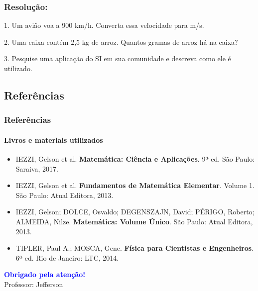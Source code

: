 \documentclass[12pt]{beamer}
\begin{document}
\begin{frame}
\frametitle{Resolução:}
1. Um avião voa a 900 km/h. Converta essa velocidade para m/s.
\vspace{6cm}
\end{frame}

\begin{frame}
2. Uma caixa contém 2,5 kg de arroz. Quantos gramas de arroz há na caixa?
\vspace{6cm}
\end{frame}

\begin{frame}
3. Pesquise uma aplicação do SI em sua comunidade e descreva como ele é utilizado.
\vspace{6cm}
\end{frame}

\begin{frame}
\section{Referências}
\frametitle{Referências}
\framesubtitle{Livros e materiais utilizados}

\begin{itemize}
    \item IEZZI, Gelson et al. \textbf{Matemática: Ciência e Aplicações}. 9ª ed. São Paulo: Saraiva, 2017.

    \item IEZZI, Gelson et al. \textbf{Fundamentos de Matemática Elementar}. Volume 1. São Paulo: Atual Editora, 2013.
    \item IEZZI, Gelson; DOLCE, Osvaldo; DEGENSZAJN, David; PÉRIGO, Roberto; ALMEIDA, Nilze. \textbf{Matemática: Volume Único}. São Paulo: Atual Editora, 2013.
    \item TIPLER, Paul A.; MOSCA, Gene. \textbf{Física para Cientistas e Engenheiros}. 6ª ed. Rio de Janeiro: LTC, 2014.
\end{itemize}
\end{frame}

\begin{frame}
\titlepage
\end{frame}

\begin{frame}
\begin{center}
    \textbf{\textcolor{blue}{\Large Obrigado pela atenção!}} \\[0.5cm]
    \small{Professor: Jefferson} \\
\end{center}
\end{frame}
\end{document}

